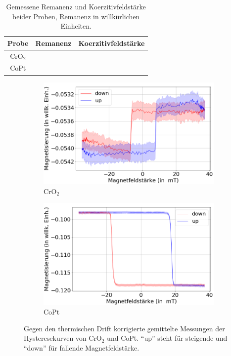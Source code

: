 	\begin{table} %
		\centering
		\caption{Gemessene Remanenz und Koerzitivfeldstärke beider Proben, Remanenz in willkürlichen Einheiten.}
		\begin{tabular}{c| c | c}
			Probe & Remanenz & Koerzitivfeldstärke \\ \hline
      CrO$_2$ &   & \\
      CoPt &   & \\
		\end{tabular}
		\label{tab:remko}
	\end{table}


\begin{figure}[H]
    \centering
    \begin{subfigure}{0.495\textwidth}
        \centering
        \includegraphics[width=1.1\textwidth]{plots/swp_avg_magn_man_cro}
    \caption{CrO$_2$}
    \end{subfigure}
    \begin{subfigure}{0.495\textwidth}
        \centering
        \includegraphics[width=1.1\textwidth]{plots/swp_avg_magn_man_copt}
        \caption{CoPt}
    \end{subfigure}
    \caption{Gegen den thermischen Drift korrigierte gemittelte Messungen der Hysteresekurven von CrO$_2$ und CoPt. \enquote{up} steht für steigende und \enquote{down} für fallende Magnetfeldstärke.}
    \label{fig_moke_averages}
\end{figure}
